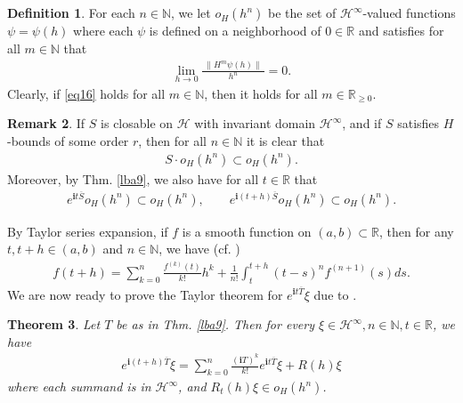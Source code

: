 \documentclass[12pt,b5paper,notitlepage]{article}
\theoremstyle{definition}
\newtheorem{df}{Definition}[section]
\newtheorem{rem}[df]{Remark}
\theoremstyle{plain}
\newtheorem{thm}[df]{Theorem}
\newcommand{\mc}{\mathcal}
\newcommand{\ovl}{\overline}
\newcommand{\im}{\mathbf{i}}
\newcommand{\Nbb}{\mathbb N}
\newcommand{\Rbb}{\mathbb R}
\numberwithin{equation}{section}
\begin{document}
\subsection{}

\begin{df}
For each $n\in\Nbb$, we let $o_H(h^n)$  be the set of $\mc H^\infty$-valued functions $\psi=\psi(h)$ where each $\psi$ is  defined on a neighborhood of $0\in\Rbb$ and satisfies  for all $m\in\Nbb$ that
\begin{align}
	\lim_{h\rightarrow 0}\frac{~\lVert H^m \psi(h)\lVert~}{h^n}=0.\label{eqa16} 
\end{align}
Clearly, if \eqref{eq16} holds for all $m\in\Nbb$, then it holds for all $m\in\Rbb_{\geq0}$.
\end{df}



\begin{rem}\label{lba11}
If $S$ is closable on $\mc H$ with invariant domain $\mc H^\infty$, and if $S$ satisfies $H$-bounds of some order $r$, then for all $n\in\Nbb$ it is clear that
\begin{align*}
S\cdot o_H(h^n)\subset o_H(h^n).	
\end{align*}
Moreover, by Thm. \ref{lba9}, we also have for all $t\in\Rbb$ that
\begin{align*}
e^{\im t\ovl S}o_H(h^n)\subset o_H(h^n),\qquad e^{\im (t+h)\ovl S}o_H(h^n)\subset o_H(h^n).	
\end{align*}
\end{rem}

By Taylor series expansion, if $f$ is a smooth function on $(a,b)\subset\Rbb$, then for any $t,t+h\in(a,b)$ and $n\in\Nbb$, we have (cf. \cite[Thm. 9.29]{Apo})
\begin{align}
	f(t+h)=\sum_{k=0}^n\frac{f^{(k)}(t)}{k!}h^k+\frac 1{n!}\int_t^{t+h}(t-s)^nf^{(n+1)}(s)ds.	\label{eqa15}
\end{align}
We are now ready to prove the Taylor theorem for $e^{\im t\ovl T}\xi$ due to \cite[Cor. 2.2]{Tol99}.



\begin{thm}\label{lba10}
Let $T$ be as in Thm. \ref{lba9}. Then for every $\xi\in\mc H^\infty,n\in\Nbb,t\in\Rbb$, we have
\begin{align}
e^{\im(t+h)\ovl T}\xi=\sum_{k=0}^n\frac{(\im T)^k}{k!}e^{\im t\ovl T}\xi+R(h)\xi	
\end{align}
where each summand is in $\mc H^\infty$, and  $R_t(h)\xi\in o_H(h^n)$.
\end{thm}
\end{document}
